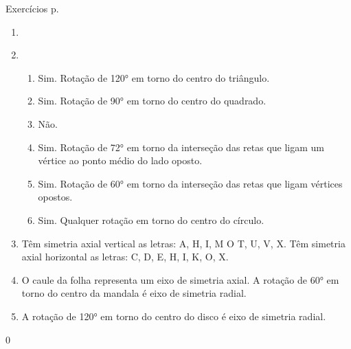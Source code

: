 \begin{answer}{Exercícios p. \pageref{transformacoes-exercise4}}
{\exerciselist
\begin{enumerate}
\item 
\begin{enumerate}
\end{enumerate}

\item
\begin{enumerate}
\item Sim. Rotação de 120° em torno do centro do triângulo.
\item Sim. Rotação de 90° em torno do centro do quadrado.
\item Não. 
\item Sim. Rotação de 72° em torno da interseção das retas que ligam um vértice ao ponto médio do lado oposto.
\item Sim. Rotação de 60° em torno da interseção das retas que ligam vértices opostos.
\item Sim. Qualquer rotação em torno do centro do círculo.
\end{enumerate}

\item Têm simetria axial vertical as letras: A, H, I, M O T, U, V, X. Têm simetria axial horizontal as letras: C, D, E, H, I, K, O, X.

\item O caule da folha representa um eixo de simetria axial. A rotação de 60° em torno do centro da mandala é eixo de simetria radial.

\item A rotação de 120° em torno do centro do disco é eixo de simetria radial.
\end{enumerate}
}{0}
\end{answer}
